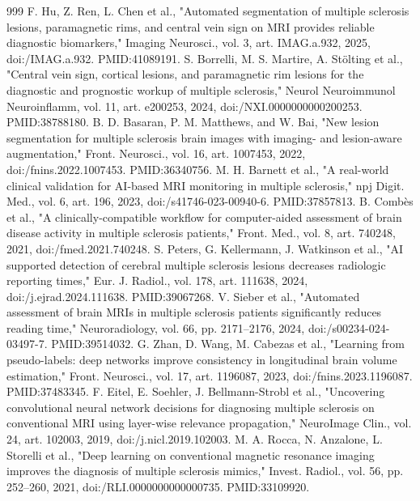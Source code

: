 \documentclass[journal,twoside,web]{ieeecolor}
\begin{document}
\begin{thebibliography}{999}
 F. Hu, Z. Ren, L. Chen et al., "Automated segmentation of multiple sclerosis lesions, paramagnetic rims, and central vein sign on MRI provides reliable diagnostic biomarkers," Imaging Neurosci., vol. 3, art. IMAG.a.932, 2025, doi:/\allowbreak IMAG.a.932. PMID:41089191.
 S. Borrelli, M. S. Martire, A. Stölting et al., "Central vein sign, cortical lesions, and paramagnetic rim lesions for the diagnostic and prognostic workup of multiple sclerosis," Neurol Neuroimmunol Neuroinflamm, vol. 11, art. e200253, 2024, doi:/\allowbreak NXI.0000000000200253. PMID:38788180.
 B. D. Basaran, P. M. Matthews, and W. Bai, "New lesion segmentation for multiple sclerosis brain images with imaging- and lesion-aware augmentation," Front. Neurosci., vol. 16, art. 1007453, 2022, doi:/\allowbreak fnins.2022.1007453. PMID:36340756.
 M. H. Barnett et al., "A real-world clinical validation for AI-based MRI monitoring in multiple sclerosis," npj Digit. Med., vol. 6, art. 196, 2023, doi:/\allowbreak s41746-023-00940-6. PMID:37857813.
 B. Combès et al., "A clinically-compatible workflow for computer-aided assessment of brain disease activity in multiple sclerosis patients," Front. Med., vol. 8, art. 740248, 2021, doi:/\allowbreak fmed.2021.740248.
 S. Peters, G. Kellermann, J. Watkinson et al., "AI supported detection of cerebral multiple sclerosis lesions decreases radiologic reporting times," Eur. J. Radiol., vol. 178, art. 111638, 2024, doi:/\allowbreak j.ejrad.2024.111638. PMID:39067268.
 V. Sieber et al., "Automated assessment of brain MRIs in multiple sclerosis patients significantly reduces reading time," Neuroradiology, vol. 66, pp. 2171--2176, 2024, doi:/\allowbreak s00234-024-03497-7. PMID:39514032.
 G. Zhan, D. Wang, M. Cabezas et al., "Learning from pseudo-labels: deep networks improve consistency in longitudinal brain volume estimation," Front. Neurosci., vol. 17, art. 1196087, 2023, doi:/\allowbreak fnins.2023.1196087. PMID:37483345.
 F. Eitel, E. Soehler, J. Bellmann-Strobl et al., "Uncovering convolutional neural network decisions for diagnosing multiple sclerosis on conventional MRI using layer-wise relevance propagation," NeuroImage Clin., vol. 24, art. 102003, 2019, doi:/\allowbreak j.nicl.2019.102003.
 M. A. Rocca, N. Anzalone, L. Storelli et al., "Deep learning on conventional magnetic resonance imaging improves the diagnosis of multiple sclerosis mimics," Invest. Radiol., vol. 56, pp. 252--260, 2021, doi:/\allowbreak RLI.0000000000000735. PMID:33109920.

\end{thebibliography}
\end{document}
